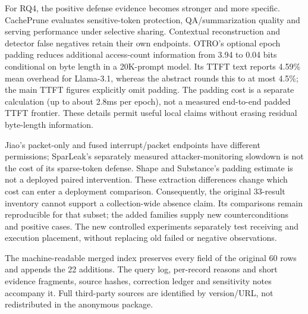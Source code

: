 For RQ4, the positive defense evidence becomes stronger and more specific. CachePrune evaluates sensitive-token protection, QA/summarization quality and serving performance under selective sharing. Contextual reconstruction and detector false negatives retain their own endpoints. OTRO's optional epoch padding reduces additional access-count information from 3.94 to 0.04 bits conditional on byte length in a 20K-prompt model. Its TTFT text reports 4.59\% mean overhead for Llama-3.1, whereas the abstract rounds this to at most 4.5\%; the main TTFT figures explicitly omit padding. The padding cost is a separate calculation (up to about 2.8ms per epoch), not a measured end-to-end padded TTFT frontier. These details permit useful local claims without erasing residual byte-length information.

Jiao's packet-only and fused interrupt/packet endpoints have different permissions; SparLeak's separately measured attacker-monitoring slowdown is not the cost of its sparse-token defense. Shape and Substance's padding estimate is not a deployed paired intervention. These extraction differences change which cost can enter a deployment comparison. Consequently, the original 33-result inventory cannot support a collection-wide absence claim. Its comparisons remain reproducible for that subset; the added families supply new counterconditions and positive cases. The new controlled experiments separately test receiving and execution placement, without replacing old failed or negative observations.

The machine-readable merged index preserves every field of the original 60 rows and appends the 22 additions. The query log, per-record reasons and short evidence fragments, source hashes, correction ledger and sensitivity notes accompany it. Full third-party sources are identified by version/URL, not redistributed in the anonymous package.
